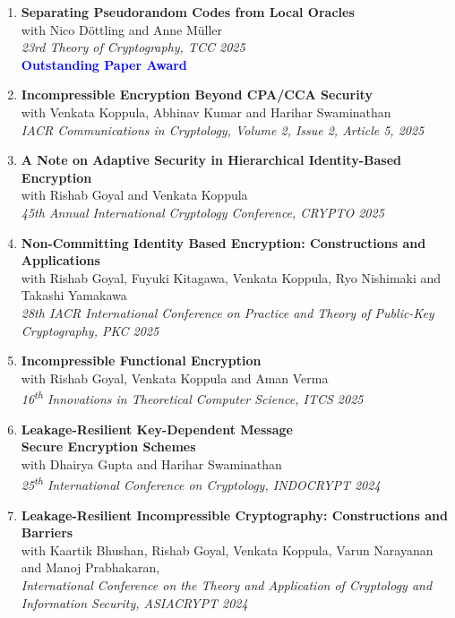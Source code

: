 \documentclass[margin]{res} %
\begin{document}
\begin{resume}
\begin{enumerate}
\item \textbf{Separating Pseudorandom Codes from Local Oracles}\\
with Nico Döttling and Anne Müller\\
\emph{23rd Theory of Cryptography, TCC 2025}\\
\textbf{\textcolor{blue}{Outstanding Paper Award}}

\item \textbf{Incompressible Encryption Beyond CPA/CCA Security}\\
with Venkata Koppula, Abhinav Kumar and Harihar Swaminathan\\
\emph{IACR Communications in Cryptology, Volume 2, Issue 2, Article 5, 2025}

\item \textbf{A Note on Adaptive Security in Hierarchical Identity-Based Encryption}\\
with Rishab Goyal and Venkata Koppula\\
\emph{45th Annual International Cryptology Conference, CRYPTO 2025}

\item \textbf{Non-Committing Identity Based Encryption: Constructions and Applications}\\
with Rishab Goyal, Fuyuki Kitagawa, Venkata Koppula, Ryo Nishimaki and Takashi Yamakawa\\
\emph{28th IACR International Conference on Practice and Theory of Public-Key Cryptography, PKC 2025}
    
\item \textbf{Incompressible Functional Encryption}\\
with Rishab Goyal, Venkata Koppula and Aman Verma\\
\emph{16\textsuperscript{th} Innovations in Theoretical Computer Science, ITCS 2025}

\item \textbf{Leakage-Resilient Key-Dependent Message\\Secure Encryption Schemes}\\
with Dhairya Gupta and Harihar Swaminathan\\
\emph{25\textsuperscript{th} International Conference on Cryptology, INDOCRYPT 2024}    

\item \textbf{Leakage-Resilient Incompressible Cryptography: Constructions and Barriers}\\
with Kaartik Bhushan, Rishab Goyal, Venkata Koppula, Varun Narayanan and Manoj Prabhakaran,\\
\emph{International Conference on the Theory and Application of Cryptology and Information Security, ASIACRYPT 2024}


\end{enumerate}
\end{resume}
\end{document}
